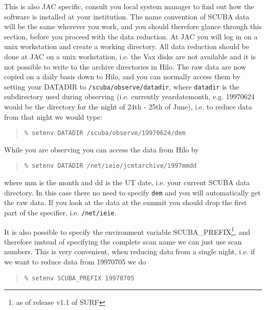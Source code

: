 \documentclass[twoside,11pt]{article}
\newenvironment{myquote}{\begin{quote}\begin{small}}{\end{small}\end{quote}}
\begin{document}
This is also JAC specific, consult you local system manager to find out how
the software is installed at your institution. The name convention of SCUBA
data will be the same wherever you work, and you should therefore glance
through this section, before you proceed with the data reduction. At JAC you
will log in on a unix workstation and create a working directory. All data
reduction should be done at JAC on a unix workstation, i.e. the Vax disks are
not available and it is not possible to write to the archive directories in
Hilo.  The raw data are now copied on a daily basis down to Hilo, and you can
normally access them by setting your DATADIR to
\texttt{/scuba/observe/datadir}, where \texttt{datadir} is the subdirectory used during
observing (i.e. currently yeardatemonth, e.g. 19970624 would be the directory
for the night of 24th - 25th of June), i.e. to reduce data from that night we
would type:

\begin{myquote}
\begin{verbatim}
% setenv DATADIR /scuba/observe/19970624/dem
\end{verbatim}
\end{myquote}

While you are observing you can access the data from Hilo by

\begin{myquote} \begin{verbatim}
% setenv DATADIR /net/ieie/jcmtarchive/1997mmdd
\end{verbatim} \end{myquote}


where mm is the month and dd is the UT date, i.e. your current SCUBA data
directory. In this case there no need to specify \texttt{dem} and you will
automatically get the raw data. If you look at the data at the summit
you should drop the first part of the specifier, i.e. \texttt{/net/ieie}.

It is also possible to specify the environment variable
SCUBA\_PREFIX\footnote{as of release v1.1 of SURF},
and therefore instead of specifying the complete scan name we can just
use scan numbers. This is very convenient, when reducing data from a
single night, i.e. if we want to reduce data from 19970705 we do

\begin{myquote} \begin{verbatim}
% setenv SCUBA_PREFIX 19970705
\end{verbatim} \end{myquote}
\end{document}
